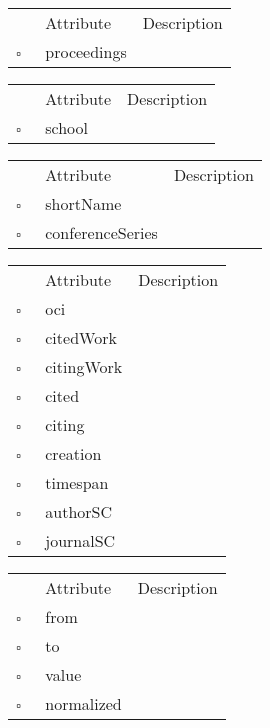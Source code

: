 \clearpage
\begin{table}
\caption{Paper  }

\begin{longtable}{llp{8cm}}
& Attribute & Description \\
$\square$\ & proceedings &  \\
\end{longtable}
\label{attr:Paper}
\end{table}

\begin{table}
\caption{PhDThesis  }

\begin{longtable}{llp{8cm}}
& Attribute & Description \\
$\square$\ & school &  \\
\end{longtable}
\label{attr:PhDThesis}
\end{table}

\begin{table}
\caption{Proceedings  }

\begin{longtable}{llp{8cm}}
& Attribute & Description \\
$\square$\ & shortName &  \\
$\square$\ & conferenceSeries &  \\
\end{longtable}
\label{attr:Proceedings}
\end{table}

\begin{table}
\caption{Reference  }

\begin{longtable}{llp{8cm}}
& Attribute & Description \\
$\square$\ & oci &  \\
$\square$\ & citedWork &  \\
$\square$\ & citingWork &  \\
$\square$\ & cited &  \\
$\square$\ & citing &  \\
$\square$\ & creation &  \\
$\square$\ & timespan &  \\
$\square$\ & authorSC &  \\
$\square$\ & journalSC &  \\
\end{longtable}
\label{attr:Reference}
\end{table}

\begin{table}
\caption{ReferenceFlow  }

\begin{longtable}{llp{8cm}}
& Attribute & Description \\
$\square$\ & from &  \\
$\square$\ & to &  \\
$\square$\ & value &  \\
$\square$\ & normalized &  \\
\end{longtable}
\label{attr:ReferenceFlow}
\end{table}

